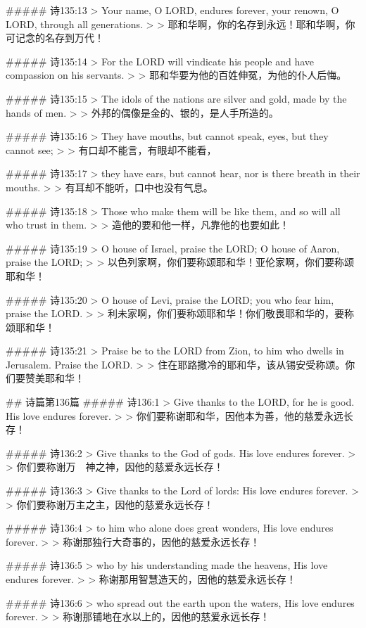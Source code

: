 ##### 诗135:13
> Your name, O LORD, endures forever, your renown, O LORD, through all generations.
>
> 耶和华啊，你的名存到永远！耶和华啊，你可记念的名存到万代！


##### 诗135:14
> For the LORD will vindicate his people and have compassion on his servants.
>
> 耶和华要为他的百姓伸冤，为他的仆人后悔。


##### 诗135:15
> The idols of the nations are silver and gold, made by the hands of men.
>
> 外邦的偶像是金的、银的，是人手所造的。


##### 诗135:16
> They have mouths, but cannot speak, eyes, but they cannot see;
>
> 有口却不能言，有眼却不能看，


##### 诗135:17
> they have ears, but cannot hear, nor is there breath in their mouths.
>
> 有耳却不能听，口中也没有气息。


##### 诗135:18
> Those who make them will be like them, and so will all who trust in them.
>
> 造他的要和他一样，凡靠他的也要如此！


##### 诗135:19
> O house of Israel, praise the LORD; O house of Aaron, praise the LORD;
>
> 以色列家啊，你们要称颂耶和华！亚伦家啊，你们要称颂耶和华！


##### 诗135:20
> O house of Levi, praise the LORD; you who fear him, praise the LORD.
>
> 利未家啊，你们要称颂耶和华！你们敬畏耶和华的，要称颂耶和华！


##### 诗135:21
> Praise be to the LORD from Zion, to him who dwells in Jerusalem. Praise the LORD.
>
> 住在耶路撒冷的耶和华，该从锡安受称颂。你们要赞美耶和华！


## 诗篇第136篇
##### 诗136:1
> Give thanks to the LORD, for he is good. His love endures forever.
>
> 你们要称谢耶和华，因他本为善，他的慈爱永远长存！


##### 诗136:2
> Give thanks to the God of gods. His love endures forever.
>
> 你们要称谢万　神之神，因他的慈爱永远长存！


##### 诗136:3
> Give thanks to the Lord of lords: His love endures forever.
>
> 你们要称谢万主之主，因他的慈爱永远长存！


##### 诗136:4
> to him who alone does great wonders, His love endures forever.
>
> 称谢那独行大奇事的，因他的慈爱永远长存！


##### 诗136:5
> who by his understanding made the heavens, His love endures forever.
>
> 称谢那用智慧造天的，因他的慈爱永远长存！


##### 诗136:6
> who spread out the earth upon the waters, His love endures forever.
>
> 称谢那铺地在水以上的，因他的慈爱永远长存！


